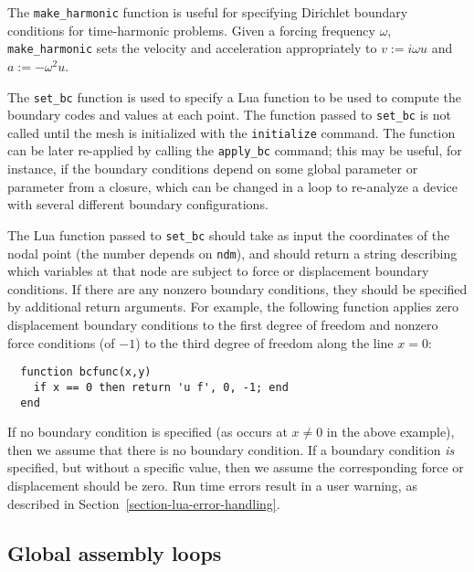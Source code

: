 \documentclass{article}
\newcommand{\ttt}[1]{\texttt{#1}}
\begin{document}
The \ttt{make\_harmonic} function is useful for specifying
Dirichlet boundary conditions for time-harmonic problems.  Given a
forcing frequency $\omega$, \ttt{make\_harmonic} sets the velocity
and acceleration appropriately to $v := i \omega u$ and $a :=
-\omega^2 u$.

The \ttt{set\_bc} function is used to specify a Lua function to be
used to compute the boundary codes and values at each point.  The
function passed to \ttt{set\_bc} is not called until the mesh is
initialized with the \ttt{initialize} command.  The function can be
later re-applied by calling the \ttt{apply\_bc} command; this may be
useful, for instance, if the boundary conditions depend on some global
parameter or parameter from a closure, which can be changed in a loop
to re-analyze a device with several different boundary configurations.

The Lua function passed to \ttt{set\_bc} should take as input the
coordinates of the nodal point (the number depends on \ttt{ndm}),
and should return a string describing which variables at that node are
subject to force or displacement boundary conditions.  If there are
any nonzero boundary conditions, they should be specified by
additional return arguments.  For example, the following function
applies zero displacement boundary conditions to the first degree of
freedom and nonzero force conditions (of $-1$) to the third degree of
freedom along the line $x = 0$:
\begin{verbatim}
  function bcfunc(x,y)
    if x == 0 then return 'u f', 0, -1; end
  end
\end{verbatim}
If no boundary condition is specified (as occurs at $x \neq 0$ in the
above example), then we assume that there is no boundary condition.
If a boundary condition \emph{is} specified, but without a specific
value, then we assume the corresponding force or displacement should
be zero.  Run time errors result in a user warning, as described in
Section~\ref{section-lua-error-handling}.


\subsection{Global assembly loops}
\end{document}
